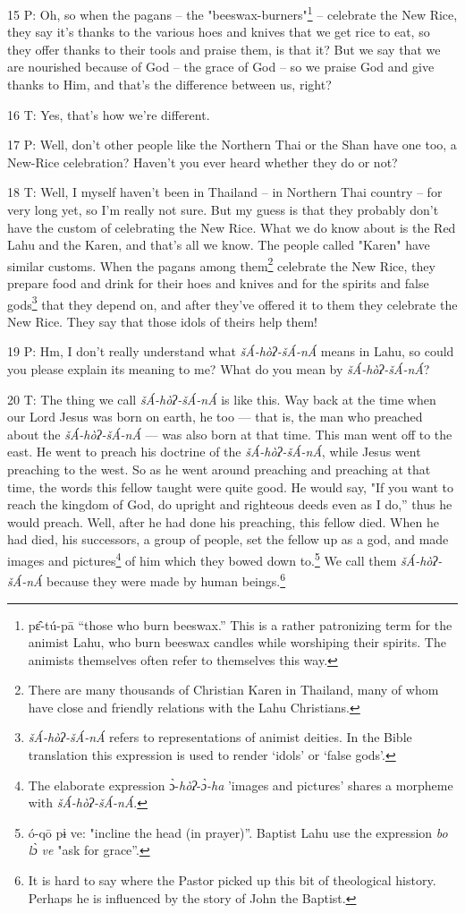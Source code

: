 15 P: Oh, so when the pagans -- the "beeswax-burners"\footnote{pɛ̂-tú-pā ``those who burn beeswax.'' This is a rather patronizing term for the animist Lahu, who burn beeswax candles while worshiping their spirits. The animists themselves often refer to themselves this way.} --
celebrate the New Rice, they say it's thanks to the various hoes and knives that
we get rice to eat, so they offer thanks to their tools and praise them, is that
it? But we say that we are nourished because of God -- the grace of God -- so we
praise God and give thanks to Him, and that's the difference between us, right?

16 T: Yes, that's how we're different.

17 P: Well, don't other people like the Northern Thai or the Shan have one too,
a New-Rice celebration? Haven't you ever heard whether they do or not?

18 T: Well, I myself haven't been in Thailand -- in Northern Thai country -- for
very long yet, so I'm really not sure. But my guess is that they probably don't
have the custom of celebrating the New Rice. What we do know about is the Red Lahu
and the Karen, and that's all we know. The people called "Karen"
have similar customs. When the pagans among them\footnote{There are many thousands of Christian Karen in Thailand, many of whom have close and friendly relations with the Lahu Christians.} celebrate the New Rice, they
prepare food and drink for their hoes and knives and for the spirits and false
gods\footnote{\textit{šÁ-hòʔ-šÁ-nÁ} refers to representations of animist deities. In the Bible translation this expression is used to render `idols' or `false gods'.} that they depend on, and after they've offered it to them they celebrate
the New Rice. They say that those idols of theirs help them!

19 P: Hm, I don't really understand what \textit{šÁ-hòʔ-šÁ-nÁ} means in
Lahu, so could you please explain its meaning to me? What do you mean by \textit{šÁ-hòʔ-šÁ-nÁ}?

20 T: The thing we call \textit{šÁ-hòʔ-šÁ-nÁ }is like this. Way back at
the time when our Lord Jesus was born on earth, he too --- that is, the man who
preached about the \textit{šÁ-hòʔ-šÁ-nÁ} --- was also born at that time.
This man went off to the east. He went to preach his doctrine of the \textit{šÁ-hòʔ-šÁ-nÁ},
while Jesus went preaching to the west. So as he went around preaching and preaching
at that time, the words this fellow taught were quite good. He would say, "If
you want to reach the kingdom of God, do upright and righteous deeds even as I
do,'' thus he would preach. Well, after he had done his preaching, this fellow
died. When he had died, his successors, a group of people, set the fellow up as
a god, and made images and pictures\footnote{The elaborate expression ɔ̀-\textit{hòʔ}-\textit{ɔ̀-ha} 'images and pictures' shares a morpheme with \textit{šÁ-hòʔ-šÁ-nÁ}.} of him which they bowed down to.\footnote{ó-qō pɨ ve: "incline the head (in prayer)''. Baptist Lahu use the expression \textit{bo lɔ̀ ve} "ask for grace''.} We
call them \textit{šÁ-hòʔ-šÁ-nÁ} because they were made by human beings.\footnote{It is hard to say where the Pastor picked up this bit of theological history. Perhaps he is influenced by the story of John the Baptist.}

